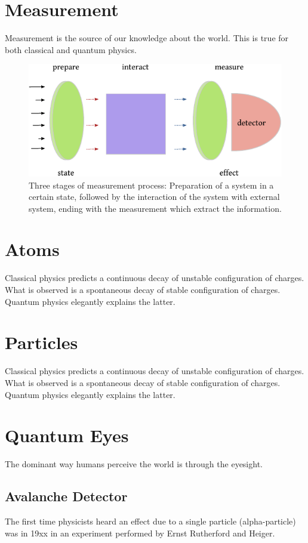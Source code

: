 \section{Measurement}
Measurement is the source of our knowledge about the world. This is true for both classical and quantum physics. 
\begin{figure}[htbp]
	\centering
	\includegraphics[scale=1.0]{measurementStages}
	\caption{Three stages of measurement process: Preparation of a system in a certain state, followed by the interaction of the system with external system, ending with the measurement which extract the information.}
	\label{fig:measurementStages}
\end{figure}

\section{Atoms}
Classical physics predicts a continuous decay of unstable configuration of charges. What is observed is a spontaneous decay of stable configuration of charges. Quantum physics elegantly explains the latter.  

\section{Particles}
Classical physics predicts a continuous decay of unstable configuration of charges. What is observed is a spontaneous decay of stable configuration of charges. Quantum physics elegantly explains the latter.  

\section{Quantum Eyes}
The dominant way humans perceive the world is through the eyesight. 

\subsection{Avalanche Detector}
The first time physicists heard an effect due to a single particle (alpha-particle) was in 19xx in an experiment performed by Ernst Rutherford and Heiger.


